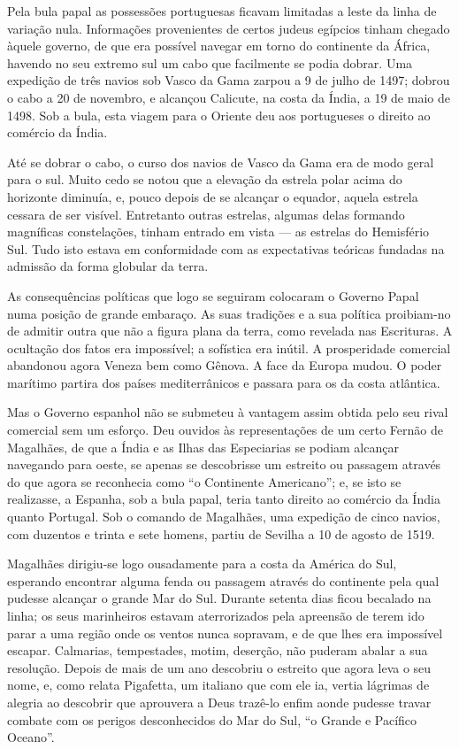 \documentclass[11pt,a5paper,twoside,openany]{book}
\begin{document}
Pela bula papal as possessões portuguesas ficavam limitadas a leste da linha de variação nula. Informações provenientes de certos judeus egípcios tinham chegado àquele governo, de que era possível navegar em torno do continente da África, havendo no seu extremo sul um cabo que facilmente se podia dobrar. Uma expedição de três navios sob Vasco da Gama zarpou a 9 de julho de 1497; dobrou o cabo a 20 de novembro, e alcançou Calicute, na costa da Índia, a 19 de maio de 1498. Sob a bula, esta viagem para o Oriente deu aos portugueses o direito ao comércio da Índia.

Até se dobrar o cabo, o curso dos navios de Vasco da Gama era de modo geral para o sul. Muito cedo se notou que a elevação da estrela polar acima do horizonte diminuía, e, pouco depois de se alcançar o equador, aquela estrela cessara de ser visível. Entretanto outras estrelas, algumas delas formando magníficas constelações, tinham entrado em vista — as estrelas do Hemisfério Sul. Tudo isto estava em conformidade com as expectativas teóricas fundadas na admissão da forma globular da terra.

As consequências políticas que logo se seguiram colocaram o Governo Papal numa posição de grande embaraço. As suas tradições e a sua política proibiam-no de admitir outra que não a figura plana da terra, como revelada nas Escrituras. A ocultação dos fatos era impossível; a sofística era inútil. A prosperidade comercial abandonou agora Veneza bem como Gênova. A face da Europa mudou. O poder marítimo partira dos países mediterrânicos e passara para os da costa atlântica.

Mas o Governo espanhol não se submeteu à vantagem assim obtida pelo seu rival comercial sem um esforço. Deu ouvidos às representações de um certo Fernão de Magalhães, de que a Índia e as Ilhas das Especiarias se podiam alcançar navegando para oeste, se apenas se descobrisse um estreito ou passagem através do que agora se reconhecia como “o Continente Americano”; e, se isto se realizasse, a Espanha, sob a bula papal, teria tanto direito ao comércio da Índia quanto Portugal. Sob o comando de Magalhães, uma expedição de cinco navios, com duzentos e trinta e sete homens, partiu de Sevilha a 10 de agosto de 1519.

Magalhães dirigiu-se logo ousadamente para a costa da América do Sul, esperando encontrar alguma fenda ou passagem através do continente pela qual pudesse alcançar o grande Mar do Sul. Durante setenta dias ficou becalado na linha; os seus marinheiros estavam aterrorizados pela apreensão de terem ido parar a uma região onde os ventos nunca sopravam, e de que lhes era impossível escapar. Calmarias, tempestades, motim, deserção, não puderam abalar a sua resolução. Depois de mais de um ano descobriu o estreito que agora leva o seu nome, e, como relata Pigafetta, um italiano que com ele ia, vertia lágrimas de alegria ao descobrir que aprouvera a Deus trazê-lo enfim aonde pudesse travar combate com os perigos desconhecidos do Mar do Sul, “o Grande e Pacífico Oceano”.
\end{document}
